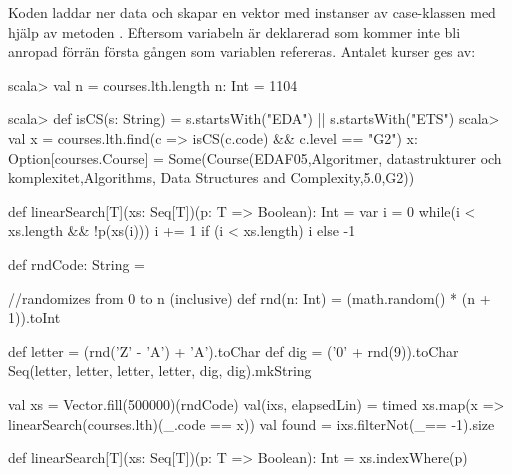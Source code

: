 \SubtaskSolved
Koden laddar ner data och skapar en vektor med instanser av case-klassen  med hjälp av metoden . Eftersom variabeln  är deklarerad som  kommer inte  bli anropad förrän första gången som variablen  refereras. Antalet kurser ges av:
\begin{REPLnonum}
scala> val n = courses.lth.length
n: Int = 1104
\end{REPLnonum}

\SubtaskSolved
\begin{REPL}
scala> def isCS(s: String) = s.startsWith("EDA") || s.startsWith("ETS")
scala> val x = courses.lth.find(c => isCS(c.code) && c.level == "G2")
x: Option[courses.Course] = Some(Course(EDAF05,Algoritmer, datastrukturer och
   komplexitet,Algorithms, Data Structures and Complexity,5.0,G2))
\end{REPL}

\SubtaskSolved
\begin{Code}
def linearSearch[T](xs: Seq[T])(p: T => Boolean): Int = {
   var i = 0
   while(i < xs.length && !p(xs(i))) i += 1
   if (i < xs.length) i else -1
}
\end{Code}

\SubtaskSolved

\begin{Code}
def rndCode: String = {
   //randomizes from 0 to n (inclusive)
   def rnd(n: Int) = (math.random() * (n + 1)).toInt

   def letter = (rnd('Z' - 'A') + 'A').toChar
   def dig = ('0' + rnd(9)).toChar
   Seq(letter, letter, letter, letter, dig, dig).mkString
}
\end{Code}

\SubtaskSolved

\begin{Code}
val xs = Vector.fill(500000)(rndCode)
val(ixs, elapsedLin) =
  timed { xs.map(x => linearSearch(courses.lth)(_.code == x)) }
val found = ixs.filterNot(_== -1).size
\end{Code}

\SubtaskSolved

\begin{Code}
def linearSearch[T](xs: Seq[T])(p: T => Boolean): Int = xs.indexWhere(p)
\end{Code}



\QUESTEND

